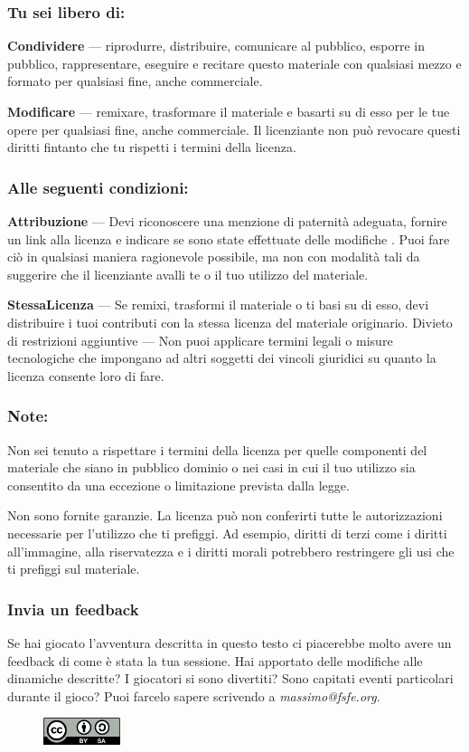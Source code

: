 \documentclass[letterpaper,twocolumn,openany,nodeprecatedcode]{dndbook}
\begin{document}
\subsubsection{Tu sei libero di:}

    \textbf{Condividere} — riprodurre, distribuire, comunicare al pubblico, esporre in pubblico, rappresentare, eseguire e recitare questo materiale con qualsiasi mezzo e formato per qualsiasi fine, anche commerciale.
    
    \textbf{Modificare} — remixare, trasformare il materiale e basarti su di esso per le tue opere per qualsiasi fine, anche commerciale.
    Il licenziante non può revocare questi diritti fintanto che tu rispetti i termini della licenza.

\subsubsection{Alle seguenti condizioni:}

    \textbf{Attribuzione} — Devi riconoscere una menzione di paternità adeguata, fornire un link alla licenza e indicare se sono state effettuate delle modifiche . Puoi fare ciò in qualsiasi maniera ragionevole possibile, ma non con modalità tali da suggerire che il licenziante avalli te o il tuo utilizzo del materiale.
    
    \textbf{StessaLicenza} — Se remixi, trasformi il materiale o ti basi su di esso, devi distribuire i tuoi contributi con la stessa licenza del materiale originario.
    Divieto di restrizioni aggiuntive — Non puoi applicare termini legali o misure tecnologiche che impongano ad altri soggetti dei vincoli giuridici su quanto la licenza consente loro di fare.

\subsubsection{Note:}

Non sei tenuto a rispettare i termini della licenza per quelle componenti del materiale che siano in pubblico dominio o nei casi in cui il tuo utilizzo sia consentito da una eccezione o limitazione prevista dalla legge.

Non sono fornite garanzie. La licenza può non conferirti tutte le autorizzazioni necessarie per l'utilizzo che ti prefiggi. Ad esempio, diritti di terzi come i diritti all'immagine, alla riservatezza e i diritti morali potrebbero restringere gli usi che ti prefiggi sul materiale.

\subsubsection{Invia un feedback}
Se hai giocato l'avventura descritta in questo testo ci piacerebbe molto avere un feedback di come è stata la tua sessione. Hai apportato delle modifiche alle dinamiche descritte? I giocatori si sono divertiti? Sono capitati eventi particolari durante il gioco? Puoi farcelo sapere scrivendo a \textit{massimo@fsfe.org}.

\begin{figure}
\centering
\includegraphics[width=0.2\textwidth]{img/by-sa.png}
\end{figure}

{}

\end{document}
